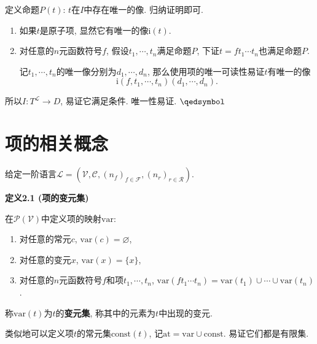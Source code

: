 \documentclass[UTF8]{ctexart}
\begin{document}
定义命题$P(t)$: $t$在$I$中存在唯一的像. 归纳证明即可.

\begin{enumerate}
    \item 如果$t$是原子项, 显然它有唯一的像$\mathrm{i}(t)$.
    \item 对任意的$n$元函数符号$f$, 假设$t_1,\cdots,t_n$满足命题$P$,
    下证$t=ft_1\cdots t_n$也满足命题$P$.

    \hspace{2.17em}
    记$t_1,\cdots, t_n$的唯一像分别为$d_1,\cdots,d_n$,
    那么使用项的唯一可读性易证$t$有唯一的像
    \[
        \mathrm{i}(f,t_1,\cdots,t_n)(d_1,\cdots,d_n).
    \]
\end{enumerate}

所以$I:T^{\mathcal{L}}\to D$, 易证它满足条件. 唯一性易证. \hfill $\qedsymbol$





\newpage

\section{项的相关概念}

给定一阶语言$\mathcal{L}=
(\mathcal{V},\mathcal{C},(n_f)_{f\in\mathcal{F}},(n_r)_{r\in\mathcal{R}})$.

\vspace{10pt}

\hypertarget{sec:定义2.1}{}
\noindent\textbf{定义2.1 (项的变元集)}

在$\mathcal{P}(\mathcal{V})$中定义项的映射$\mathrm{var}$:
\begin{enumerate}
    \item 对任意的常元$c$, $\mathrm{var}(c)=\varnothing$,
    \item 对任意的变元$x$, $\mathrm{var}(x)=\{x\}$,
    \item 对任意的$n$元函数符号$f$和项$t_1,\cdots,t_n$,
    $\mathrm{var}(ft_1\cdots t_n)=\mathrm{var}(t_1)\cup\cdots\cup\mathrm{var}(t_n)$.
\end{enumerate}

称$\mathrm{var}(t)$为$t$的\textbf{变元集}, 称其中的元素为$t$中出现的变元.

\vspace{10pt}

类似地可以定义项$t$的常元集$\mathrm{const}(t)$,
记$\mathrm{at}=\mathrm{var}\cup\mathrm{const}$. 易证它们都是有限集.

\vspace{10pt}
\end{document}
